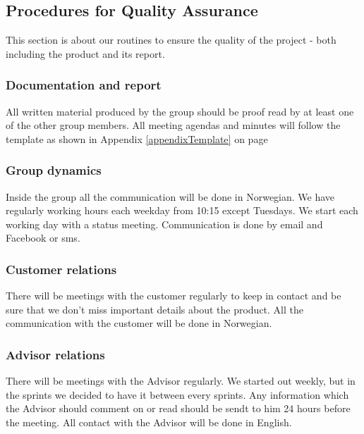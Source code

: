 \subsection{Procedures for Quality Assurance}
This section is about our routines to ensure the quality of the project - both including the product and its report. 

\subsubsection{Documentation and report}
All written material produced by the group should be proof read by at least one of the other group members. All meeting agendas and minutes will follow the template as shown in Appendix \ref{appendixTemplate} on page \pageref{appendixTemplate}


\subsubsection{Group dynamics}
Inside the group all the communication will be done in Norwegian. We have regularly working hours each weekday from 10:15 except Tuesdays. We start each working day with a status meeting. 
Communication is done by email and Facebook or sms. 

\subsubsection{Customer relations}
There will be meetings with the customer regularly to keep in contact and be sure that we don't miss important details about the product. All the communication with the customer will be done in Norwegian. 


\subsubsection{Advisor relations}
There will be meetings with the Advisor regularly. We started out weekly, but in the sprints we decided to have it between every sprints. Any information which the Advisor should comment on or read should be sendt to him 24 hours before the meeting. All contact with the Advisor will be done in English. 